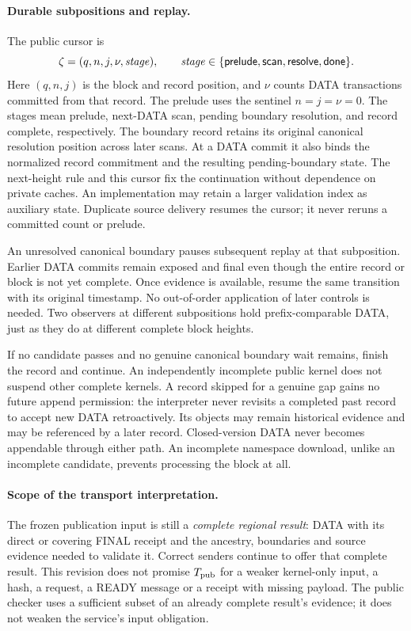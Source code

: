 \paragraph{Durable subpositions and replay.}
\label{sec:subpositions}
The public cursor is
\[
 \zeta=(q,n,j,\nu,\mathit{stage}),\qquad
 \mathit{stage}\in\{\mathsf{prelude},\mathsf{scan},\mathsf{resolve},\mathsf{done}\}.
\]
Here $(q,n,j)$ is the block and record position, and $\nu$ counts DATA
transactions committed from that record. The prelude uses the sentinel
$n=j=\nu=0$. The stages mean prelude, next-DATA scan, pending boundary
resolution, and record complete, respectively. The boundary record
retains its original canonical resolution position across later scans.
At a DATA commit it also binds the normalized record commitment and
the resulting pending-boundary state. The next-height rule and this
cursor fix the continuation without dependence on private caches.
An implementation may retain a larger validation index as auxiliary
state. Duplicate source delivery resumes the cursor; it never reruns
a committed count or prelude.

An unresolved canonical boundary pauses subsequent replay at that
subposition. Earlier DATA commits remain exposed and final even though
the entire record or block is not yet complete. Once evidence is
available, resume the same transition with its original timestamp.
No out-of-order application of later controls is needed. Two observers
at different subpositions hold prefix-comparable DATA, just as they do
at different complete block heights.

If no candidate passes and no genuine canonical boundary wait remains,
finish the record and continue. An independently incomplete public kernel
does not suspend other complete kernels. A record skipped for a genuine
gap gains no future append permission: the interpreter never revisits
a completed past record to accept new DATA retroactively. Its objects
may remain historical evidence and may be referenced by a later record.
Closed-version DATA never becomes appendable through either path.
An incomplete namespace download, unlike an incomplete candidate,
prevents processing the block at all.

\paragraph{Scope of the transport interpretation.}
\label{sec:transport-scope}
The frozen publication input is still a \emph{complete regional result}:
DATA with its direct or covering FINAL receipt and the ancestry,
boundaries and source evidence needed to validate it. Correct senders
continue to offer that complete result. This revision does not promise
$T_{\rm pub}$ for a weaker kernel-only input, a hash, a request, a READY
message or a receipt with missing payload. The public checker uses a
sufficient subset of an already complete result's evidence; it does not
weaken the service's input obligation.

